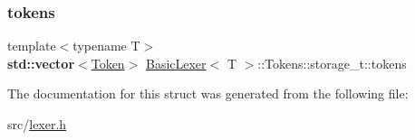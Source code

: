 \mbox{\label{struct_basic_lexer_1_1_tokens_1_1storage__t_a5150826387fcf46d98647a4d4e3fc83f}} 
\subsubsection{\texorpdfstring{tokens}{tokens}}
{\footnotesize\ttfamily template$<$typename T$>$ \\
\textbf{ std\+::vector}$<$\hyperlink{class_token}{Token}$>$ \hyperlink{class_basic_lexer}{Basic\+Lexer}$<$ T $>$\+::Tokens\+::storage\+\_\+t\+::tokens}



The documentation for this struct was generated from the following file\+:\begin{DoxyCompactItemize}
\item 
src/\hyperlink{lexer_8h}{lexer.\+h}\end{DoxyCompactItemize}
